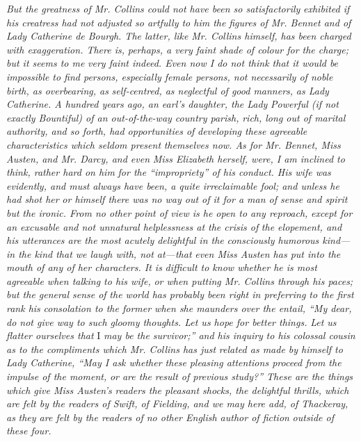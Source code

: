 \documentclass[12pt,openright]{book}
\begin{document}
\textit{But the greatness of Mr. Collins could not have been so satisfactorily}\textit{ }\textit{exhibited if his creatress had not adjusted so artfully to him the}\textit{ }\textit{figures of Mr. Bennet and of Lady Catherine de Bourgh. The latter, like}\textit{ }\textit{Mr. Collins himself, has been charged with exaggeration. There is,}\textit{ }\textit{perhaps, a very faint shade of colour for the charge; but it seems to me}\textit{ }\textit{very faint indeed. Even now I do not think that it would be impossible}\textit{ }\textit{to find persons, especially female persons, not necessarily of noble}\textit{ }\textit{birth, as overbearing, as}\textit{ }\textit{self-centred, as neglectful of good manners,}\textit{ }\textit{as Lady Catherine. A hundred years ago, an earl’s daughter, the Lady}\textit{ }\textit{Powerful (if not exactly Bountiful) of an out-of-the-way country parish,}\textit{ }\textit{rich, long out of marital authority, and so forth, had opportunities of}\textit{ }\textit{developing these agreeable characteristics which seldom present}\textit{ }\textit{themselves now. As for Mr. Bennet, Miss Austen, and Mr. Darcy, and even}\textit{ }\textit{Miss Elizabeth herself, were, I am inclined to think, rather hard on him}\textit{ }\textit{for the “impropriety” of his conduct. His wife was evidently, and must}\textit{ }\textit{always have been, a quite irreclaimable fool; and unless he had shot her}\textit{ }\textit{or himself there was no way out of it for a man of sense and spirit but}\textit{ }\textit{the ironic. From no other point of view is he open to any reproach,}\textit{ }\textit{except for an excusable and not unnatural helplessness at the crisis of}\textit{ }\textit{the elopement, and his utterances are the most acutely delightful in the}\textit{ }\textit{consciously humorous kind—in the kind that we laugh with, not at—that}\textit{ }\textit{even Miss Austen has put into the mouth of any of her characters. It is}\textit{ }\textit{difficult to know whether he is most agreeable when talking to his wife,}\textit{ }\textit{or when putting Mr. Collins through his paces; but the general sense of}\textit{ }\textit{the world has probably been right in preferring to the first rank his}\textit{ }\textit{consolation to the former when she maunders over the entail, “My dear,}\textit{ }\textit{do not give way to such gloomy thoughts. Let us hope for better things.}\textit{ }\textit{Let us flatter ourselves that} I \textit{may be the survivor;” and his inquiry}\textit{ }\textit{to his colossal cousin as to the compliments which Mr. Collins has just}\textit{ }\textit{related as made by himself to Lady Catherine, “May I ask whether these}\textit{ }\textit{pleasing attentions proceed from the impulse of the moment,}\textit{ }\textit{or are the}\textit{ }\textit{result of previous study?” These are the things which give Miss Austen’s}\textit{ }\textit{readers the pleasant shocks, the delightful thrills, which are felt by}\textit{ }\textit{the readers of Swift, of Fielding, and we may here add, of Thackeray, as}\textit{ }\textit{they are felt by the readers of no other English author of fiction}\textit{ }\textit{outside of these four.}
\end{document}
